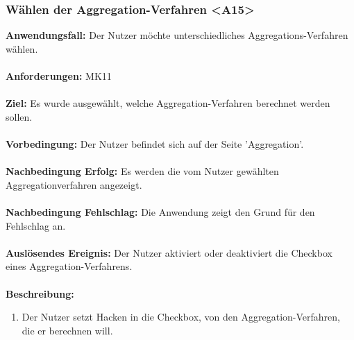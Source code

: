 \documentclass[parskip=full]{scrartcl} %
\begin{document}
\subsubsection*{Wählen der Aggregation-Verfahren <A15>}
\textbf{Anwendungsfall:} Der Nutzer möchte unterschiedliches Aggregations-Verfahren wählen.\\\\
\textbf{Anforderungen:} MK11\\\\
\textbf{Ziel:} Es wurde ausgewählt, welche Aggregation-Verfahren berechnet werden sollen.\\\\
\textbf{Vorbedingung:} Der Nutzer befindet sich auf der Seite 'Aggregation'.\\\\
\textbf{Nachbedingung Erfolg:} Es werden die vom Nutzer gewählten Aggregationverfahren angezeigt.\\\\
\textbf{Nachbedingung Fehlschlag:} Die Anwendung zeigt den Grund für den Fehlschlag an. \\\\
\textbf{Auslösendes Ereignis:} Der Nutzer aktiviert oder deaktiviert die Checkbox eines Aggregation-Verfahrens. \\\\
\textbf{Beschreibung:}
\begin{enumerate}
    \item Der Nutzer setzt Hacken in die Checkbox, von den Aggregation-Verfahren, die er berechnen will.
\end{enumerate}
\newpage
\end{document}
